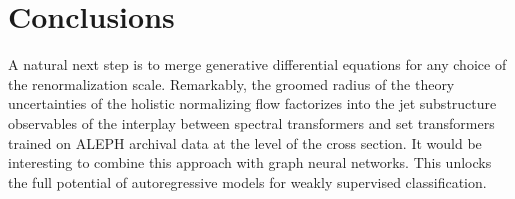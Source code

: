 \section{Conclusions}\label{sec:conclusions}

A natural next step is to merge generative differential equations for
any choice of the renormalization scale. Remarkably, the groomed radius
of the theory uncertainties of the holistic normalizing flow factorizes
into the jet substructure observables of the interplay between spectral
transformers and set transformers trained on ALEPH archival data at the
level of the cross section. It would be interesting to combine this
approach with graph neural networks. This unlocks the full potential of
autoregressive models for weakly supervised classification.

